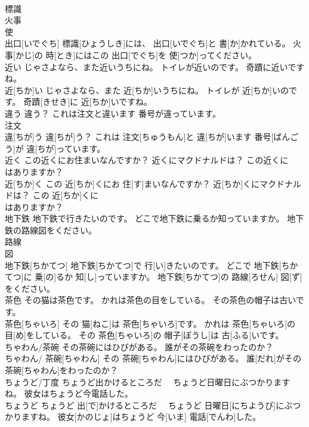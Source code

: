 \documentclass[8pt]{extreport}
\begin{document}
\begin{CJK}{UTF8}{min}
\\	標識 
\\	火事 
\\	使 
\\	出口[いでぐち] 標識[ひょうしき]には、 出口[いでぐち]と 書[か]かれている。 火事[かじ]の 時[とき]にはこの 出口[でぐち]を 使[つか]ってください。
\\	近い じゃさよなら、また近いうちにね。 トイレが近いのです。 奇蹟に近いですね。	
\\	近[ちか]い じゃさよなら、また 近[ちか]いうちにね。 トイレが 近[ちか]いのです。 奇蹟[きせき]に 近[ちか]いですね。
\\	違う 違う？ これは注文と違います 番号が違っています。	
\\	注文 
\\	違[ちが]う 違[ちが]う？ これは 注文[ちゅうもん]と 違[ちが]います 番号[ばんごう]が 違[ちが]っています。
\\	近く この近くにお住まいなんですか？ 近くにマクドナルドは？ この近くに
\\	はありますか？	
\\	近[ちか]く この 近[ちか]くにお 住[す]まいなんですか？ 近[ちか]くにマクドナルドは？ この 近[ちか]くに 
\\	はありますか？
\\	地下鉄 地下鉄で行きたいのです。 どこで地下鉄に乗るか知っていますか。 地下鉄の路線図をください。	
\\	路線 
\\	図 
\\	地下鉄[ちかてつ] 地下鉄[ちかてつ]で 行[い]きたいのです。 どこで 地下鉄[ちかてつ]に 乗[の]るか 知[し]っていますか。 地下鉄[ちかてつ]の 路線[ろせん] 図[ず]をください。
\\	茶色 その猫は茶色です。 かれは茶色の目をしている。 その茶色の帽子は古いです。	
\\	茶色[ちゃいろ] その 猫[ねこ]は 茶色[ちゃいろ]です。 かれは 茶色[ちゃいろ]の 目[め]をしている。 その 茶色[ちゃいろ]の 帽子[ぼうし]は 古[ふる]いです。
\\	ちゃわん/茶碗 その茶碗にはひびがある。 誰がその茶碗をわったのか？	
\\	ちゃわん/ 茶碗[ちゃわん] その 茶碗[ちゃわん]にはひびがある。 誰[だれ]がその 茶碗[ちゃわん]をわったのか？
\\	ちょうど/丁度 ちょうど出かけるところだ　 ちょうど日曜日にぶつかりますね。 彼女はちょうど今電話した。	
\\	ちょうど ちょうど 出[で]かけるところだ　 ちょうど 日曜日[にちようび]にぶつかりますね。 彼女[かのじょ]はちょうど 今[いま] 電話[でんわ]した。

\end{CJK}
\end{document}
